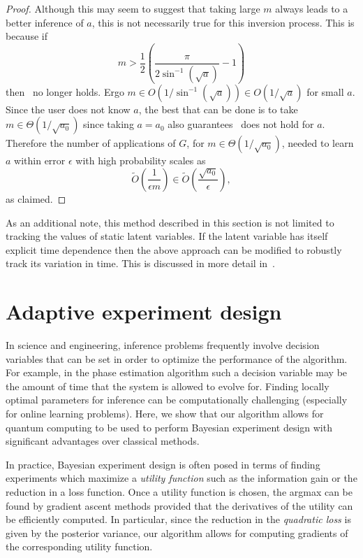 \documentclass[aps,amsmath,onecolumn,amssymb,notitlepage]{revtex4-1}
\begin{document}
\begin{proof}
Although this may seem to suggest that taking large $m$ always leads to a better inference of $a$, this is not necessarily true for this inversion process.  This is because if 
\begin{equation}
m > \frac{1}{2}\left(\frac{\pi}{2\sin^{-1}(\sqrt{a})}-1\right)\label{eq:mvalid}
\end{equation} then~ no longer holds.  Ergo $m\in O(1/\sin^{-1}(\sqrt{a}))\in O(1/\sqrt{a})$ for small $a$.  Since the user does not know $a$, the best that can be done is to take $m\in \Theta(1/\sqrt{a_0})$ since taking $a=a_0$ also guarantees~ does not hold for $a$.  Therefore the number of applications of $G$, for $m\in \Theta(1/\sqrt{a_0})$, needed to learn $a$ within error $\epsilon$ with high probability scales as
\begin{equation}
\tilde O\left(\frac{1}{\epsilon m} \right) \in \tilde O\left(\frac{\sqrt{a_0}}{\epsilon} \right),
\end{equation}
as claimed.
\end{proof}

As an additional note, this method described in this section is not limited to tracking the values of static latent variables.  If the latent variable has itself explicit time dependence then the above approach can
be modified to robustly track its variation in time.  This is discussed in more detail in~.


\section{Adaptive experiment design}

In science and engineering, inference problems frequently involve decision variables that can
be set in order to optimize the performance of the algorithm.  For example, in the phase estimation 
algorithm such a decision variable may be the amount of time that the system is allowed to 
evolve for.  Finding locally optimal parameters for inference can be computationally challenging
(especially for online learning problems). Here, we show that our algorithm allows for quantum
computing to be used to perform Bayesian experiment design with significant
advantages over classical methods.

In practice, Bayesian experiment design is often posed in terms of finding
experiments which maximize a \emph{utility function} such as the information
gain or the reduction in a loss function. Once a utility function is
chosen, the argmax can be found by gradient ascent methods provided that the
derivatives of the utility can be efficiently computed. In particular, since
the reduction in the \emph{quadratic loss} is given by the posterior variance,
our algorithm allows for computing gradients of the corresponding utility
function.
\end{document}

